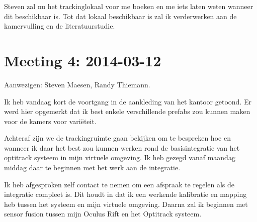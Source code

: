 Steven zal nu het trackinglokaal voor me boeken en me iets laten weten wanneer
dit beschikbaar is. Tot dat lokaal beschikbaar is zal ik verderwerken aan de
kamervulling en de literatuurstudie.


\section{Meeting 4: 2014-03-12}
Aanwezigen: Steven Maesen, Randy Thiemann.

Ik heb vandaag kort de voortgang in de aankleding van het kantoor getoond. Er 
werd hier opgemerkt dat ik best enkele verschillende prefabs zou kunnen maken
voor de kamers voor variëteit.

Achteraf zijn we de trackingruimte gaan bekijken om te bespreken hoe en wanneer
ik daar het best zou kunnen werken rond de basisintegratie van het optitrack
systeem in mijn virtuele omgeving. Ik heb gezegd vanaf maandag middag daar te
beginnen met het werk aan de integratie.

Ik heb afgesproken zelf contact te nemen om een afspraak te regelen als de
integratie compleet is. Dit houdt in dat ik een werkende kalibratie en mapping
heb tussen het systeem en mijn virtuele omgeving. Daarna zal ik beginnen met
sensor fusion tussen mijn Oculus Rift en het Optitrack systeem.